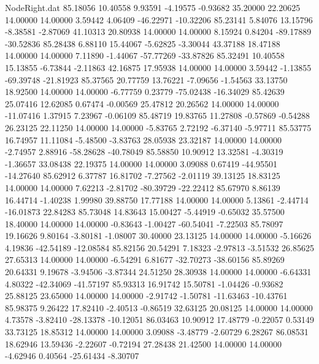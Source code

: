 \begin{filecontents}{NodeRight.dat}
  85.18056   10.40558    9.93591    -4.19575   -0.93682   35.20000   22.20625   14.00000   14.00000    3.59442    4.06409  -46.22971  -10.32206
  85.23141    5.84076   13.15796    -8.38581   -2.87069   41.10313   20.80938   14.00000   14.00000    8.15924    0.84204  -89.17889  -30.52836
  85.28438    6.88110   15.44067    -5.62825   -3.30044   43.37188   18.47188   14.00000   14.00000    7.11890   -1.44067  -57.77269  -33.87826
  85.32491   10.40558   15.13855    -6.73844   -2.11863   42.16875   17.95938   14.00000   14.00000    3.59442   -1.13855  -69.39748  -21.81923
  85.37565   20.77759   13.76221    -7.09656   -1.54563   33.13750   18.92500   14.00000   14.00000   -6.77759    0.23779  -75.02438  -16.34029
  85.42639   25.07416   12.62085     0.67474   -0.00569   25.47812   20.26562   14.00000   14.00000  -11.07416    1.37915    7.23967   -0.06109
  85.48719   19.83765   11.27808    -0.57869   -0.54288   26.23125   22.11250   14.00000   14.00000   -5.83765    2.72192   -6.37140   -5.97711
  85.53775   16.74957   11.11084    -5.48500   -3.83763   28.05938   23.32187   14.00000   14.00000   -2.74957    2.88916  -58.28628  -40.78049
  85.58850   10.90912   13.32581    -4.30319   -1.36657   33.08438   22.19375   14.00000   14.00000    3.09088    0.67419  -44.95501  -14.27640
  85.62912    6.37787   16.81702    -7.27562   -2.01119   39.13125   18.83125   14.00000   14.00000    7.62213   -2.81702  -80.39729  -22.22412
  85.67970    8.86139   16.44714    -1.40238    1.99980   39.88750   17.77188   14.00000   14.00000    5.13861   -2.44714  -16.01873   22.84283
  85.73048   14.83643   15.00427    -5.44919   -0.65032   35.57500   18.40000   14.00000   14.00000   -0.83643   -1.00427  -60.54041   -7.22503
  85.78097   19.16626    9.80164    -3.80181   -1.08007   30.40000   23.13125   14.00000   14.00000   -5.16626    4.19836  -42.54189  -12.08584
  85.82156   20.54291    7.18323    -2.97813   -3.51532   26.85625   27.65313   14.00000   14.00000   -6.54291    6.81677  -32.70273  -38.60156
  85.89269   20.64331    9.19678    -3.94506   -3.87344   24.51250   28.30938   14.00000   14.00000   -6.64331    4.80322  -42.34069  -41.57197
  85.93313   16.91742   15.50781    -1.04426   -0.93682   25.88125   23.65000   14.00000   14.00000   -2.91742   -1.50781  -11.63463  -10.43761
  85.98375    9.26422   17.82410    -2.40513   -0.86519   32.63125   20.08125   14.00000   14.00000    4.73578   -3.82410  -28.13378  -10.12051
  86.03463   10.90912   17.48779    -0.22057    0.53149   33.73125   18.85312   14.00000   14.00000    3.09088   -3.48779   -2.60729    6.28267
  86.08531   18.62946   13.59436    -2.22607   -0.72194   27.28438   21.42500   14.00000   14.00000   -4.62946    0.40564  -25.61434   -8.30707

\end{filecontents}
